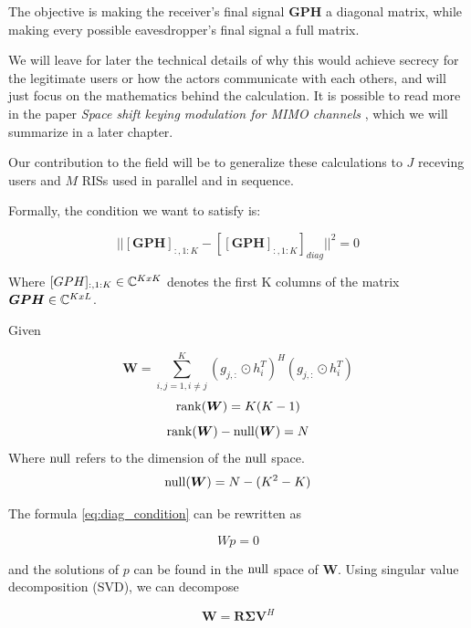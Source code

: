 The objective is making the receiver's final signal $\bm{GPH}$ a diagonal matrix, while making every possible eavesdropper's final signal a full matrix.

We will leave for later the technical details of why this would achieve secrecy for the legitimate users or how the actors communicate with each others, and will just focus on the mathematics behind the calculation. It is possible to read more in the paper \textit{Space shift keying modulation for MIMO channels} \cite{5165332}, which we will summarize in a later chapter.

Our contribution to the field will be to generalize these calculations to $J$ receving users and $M$ RISs used in parallel and in sequence.

Formally, the condition we want to satisfy is:

\begin{equation}
  || [\bm{GPH}]_{:,1:K} - [[\bm{GPH}]_{:,1:K}]_{diag} || ^2 = 0
  \label{eq:diag_condition}
\end{equation}

Where $[GPH]_{:,1:K} \in \mathbb{C}^{KxK}$ denotes the first K columns of the matrix $\bm{GPH} \in \mathbb{C}^{KxL}$.

Given

\begin{equation}
  \bm{W} = \sum_{i,j = 1, i \ne j}^{K} (g_{j,:} \odot h_i^T)^H (g_{j,:} \odot h_i^T)
\end{equation}
\begin{equation}
  \operatorname{rank}(\bm{W}) = K(K-1)
\end{equation}
\begin{equation}
  \operatorname{rank}(\bm{W}) - \operatorname{null}(\bm{W}) = N
\end{equation}
Where $\operatorname{null}$ refers to the dimension of the $\operatorname{null}$ space.
\begin{equation}
  \operatorname{null}(\bm{W}) = N - (K^2 - K)
\end{equation}

The formula \eqref{eq:diag_condition} can be rewritten as

\begin{equation}Wp = 0\end{equation}

and the solutions of $p$ can be found in the $\operatorname{null}$ space of $\bm{W}$. Using singular value decomposition (SVD), we can decompose

\begin{equation}
  \bm{W} = \bm{R \Sigma V}^H
\end{equation}

